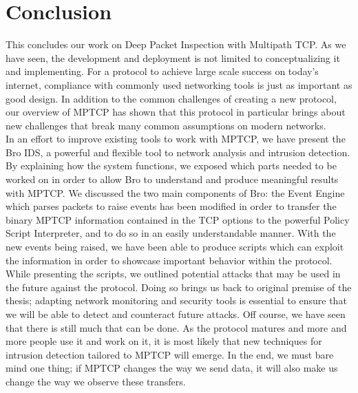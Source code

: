 


\chapter{Conclusion} \label{chap:conclusion}
This concludes our work on Deep Packet Inspection with Multipath TCP. As we have seen, the development and deployment is not limited to conceptualizing it and implementing. For a protocol to achieve large scale success on today's internet, compliance with commonly used networking tools is just as important as good design. In addition to the common challenges of creating a new protocol, our overview of MPTCP has shown that this protocol in particular brings about new challenges that break many common assumptions on modern networks.\\

In an effort to improve existing tools to work with MPTCP, we have present the Bro IDS, a powerful and flexible tool to network analysis and intrusion detection. By explaining how the system functions, we exposed which parts needed to be worked on in order to allow Bro to understand and produce meaningful results with MPTCP. We discussed the two main components of Bro: the Event Engine which parses packets to raise events has been modified in order to transfer the binary MPTCP information contained in the TCP options to the powerful Policy Script Interpreter, and to do so in an easily understandable manner. With the new events being raised, we have been able to produce scripts which can exploit the information in order to showcase important behavior within the protocol. \\

While presenting the scripts, we outlined potential attacks that may be used in the future against the protocol. Doing so brings us back to original premise of the thesis; adapting network monitoring and security tools is essential to ensure that we will be able to detect and counteract future attacks. Off course, we have seen that there is still much that can be done. As the protocol matures and more and more people use it and work on it, it is most likely that new techniques for intrusion detection tailored to MPTCP will emerge. In the end, we must bare mind one thing; if MPTCP changes the way we send data, it will also make us change the way we observe these transfers.